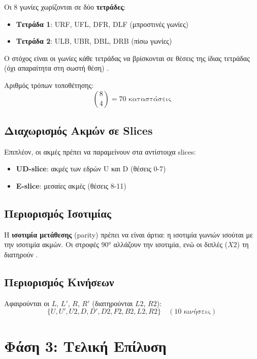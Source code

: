 Οι 8 γωνίες χωρίζονται σε δύο \textbf{τετράδες}:
\begin{itemize}
    \item \textbf{Τετράδα 1}: URF, UFL, DFR, DLF (μπροστινές γωνίες)
    \item \textbf{Τετράδα 2}: ULB, UBR, DBL, DRB (πίσω γωνίες)
\end{itemize}

Ο στόχος είναι οι γωνίες κάθε τετράδας να βρίσκονται σε θέσεις της ίδιας τετράδας (όχι απαραίτητα στη σωστή θέση) \cite{scherphuis_thistlethwaite_summary}.

Αριθμός τρόπων τοποθέτησης:
\begin{equation}
    \binom{8}{4} = 70 \text{ καταστάσεις}
\end{equation}

\subsection{Διαχωρισμός Ακμών σε Slices}

Επιπλέον, οι ακμές πρέπει να παραμείνουν στα αντίστοιχα slices:
\begin{itemize}
    \item \textbf{UD-slice}: ακμές των εδρών U και D (θέσεις 0-7)
    \item \textbf{E-slice}: μεσαίες ακμές (θέσεις 8-11)
\end{itemize}

\subsection{Περιορισμός Ισοτιμίας}

Η \textbf{ισοτιμία μετάθεσης} (parity) πρέπει να είναι άρτια: η ισοτιμία γωνιών ισούται με την ισοτιμία ακμών. Οι στροφές 90° αλλάζουν την ισοτιμία, ενώ οι διπλές ($X2$) τη διατηρούν \cite{scherphuis_thistlethwaite_summary,kociemba_twophase_details}.

\subsection{Περιορισμός Κινήσεων}

Αφαιρούνται οι $L$, $L'$, $R$, $R'$ (διατηρούνται $L2$, $R2$):
\begin{equation}
    \{U, U', U2, D, D', D2, F2, B2, L2, R2\} \quad (10 \text{ κινήσεις})
\end{equation}


\section{Φάση 3: Τελική Επίλυση}
\label{sec:phase3}

